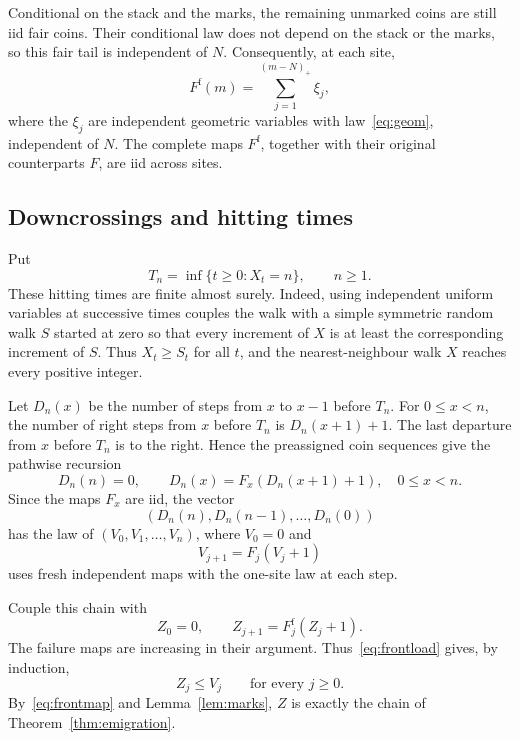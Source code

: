 \documentclass[11pt]{amsart}
\numberwithin{equation}{section}
\theoremstyle{remark}
\begin{document}
Conditional on the stack and the marks, the remaining unmarked coins are still iid fair coins. Their conditional law does not depend on the stack or the marks, so this fair tail is independent of $N$. Consequently, at each site,
\begin{equation}\label{eq:frontmap}
 F^{\mathrm f}(m)=\sum_{j=1}^{(m-N)_+}\xi_j,
\end{equation}
where the $\xi_j$ are independent geometric variables with law~\eqref{eq:geom}, independent of $N$. The complete maps $F^{\mathrm f}$, together with their original counterparts $F$, are iid across sites.

\subsection{Downcrossings and hitting times}

Put
\[
 T_n=\inf\{t\ge0:X_t=n\},\qquad n\ge1.
\]
These hitting times are finite almost surely. Indeed, using independent uniform variables at successive times couples the walk with a simple symmetric random walk $S$ started at zero so that every increment of $X$ is at least the corresponding increment of $S$. Thus $X_t\ge S_t$ for all $t$, and the nearest-neighbour walk $X$ reaches every positive integer.

Let $D_n(x)$ be the number of steps from $x$ to $x-1$ before $T_n$. For $0\le x<n$, the number of right steps from $x$ before $T_n$ is $D_n(x+1)+1$. The last departure from $x$ before $T_n$ is to the right. Hence the preassigned coin sequences give the pathwise recursion
\begin{equation}\label{eq:downcross}
 D_n(n)=0,\qquad D_n(x)=F_x(D_n(x+1)+1),\quad 0\le x<n.
\end{equation}
Since the maps $F_x$ are iid, the vector
\[
 (D_n(n),D_n(n-1),\ldots,D_n(0))
\]
has the law of $(V_0,V_1,\ldots,V_n)$, where $V_0=0$ and
\begin{equation}\label{eq:backward}
 V_{j+1}=F_j(V_j+1)
\end{equation}
uses fresh independent maps with the one-site law at each step.

Couple this chain with
\[
 Z_0=0,\qquad Z_{j+1}=F_j^{\mathrm f}(Z_j+1).
\]
The failure maps are increasing in their argument. Thus~\eqref{eq:frontload} gives, by induction,
\begin{equation}\label{eq:chainorder}
 Z_j\le V_j\qquad\text{for every }j\ge0.
\end{equation}
By~\eqref{eq:frontmap} and Lemma~\ref{lem:marks}, $Z$ is exactly the chain of Theorem~\ref{thm:emigration}.
\end{document}
